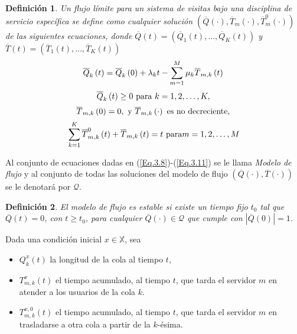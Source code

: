 \documentclass{article}
\newtheorem{Def}{Definición}
\begin{document}
\begin{Def}
Un flujo l\'imite para un sistema de visitas bajo una disciplina de servicio espec\'ifica se define como cualquier soluci\'on
 $\left(\overline{Q}\left(\cdot\right),\overline{T}_{m}\left(\cdot\right),\overline{T}_{m}^{0}\left(\cdot\right)\right)$  de las siguientes ecuaciones, donde $\overline{Q}\left(t\right)=\left(\overline{Q}_{1}\left(t\right),\ldots,\overline{Q}_{K}\left(t\right)\right)$ y $\overline{T}\left(t\right)=\left(\overline{T}_{1}\left(t\right),\ldots,\overline{T}_{K}\left(t\right)\right)$
\begin{equation}\label{Eq.3.8}
\overline{Q}_{k}\left(t\right)=\overline{Q}_{k}\left(0\right)+\lambda_{k}t-\sum_{m=1}^{M}\mu_{k}\overline{T}_{m,k}\left(t\right)\\
\end{equation}
\begin{equation}\label{Eq.3.9}
\overline{Q}_{k}\left(t\right)\geq0\textrm{ para }k=1,2,\ldots,K,\\
\end{equation}
\begin{equation}\label{Eq.3.10}
\overline{T}_{m,k}\left(0\right)=0,\textrm{ y }\overline{T}_{m,k}\left(\cdot\right)\textrm{ es no decreciente},\\
\end{equation}
\begin{equation}\label{Eq.3.11}
\sum_{k=1}^{K}\overline{T}_{m,k}^{0}\left(t\right)+\overline{T}_{m,k}\left(t\right)=t\textrm{ para}m=1,2,\ldots,M\\
\end{equation}
\end{Def}

Al conjunto de ecuaciones dadas en (\ref{Eq.3.8})-(\ref{Eq.3.11}) se le llama {\em Modelo de flujo} y al conjunto de todas las
soluciones del modelo de flujo $\left(\overline{Q}\left(\cdot\right),\overline{T} \left(\cdot\right)\right)$ se le denotar\'a por $\mathcal{Q}$.


\begin{Def}
El modelo de flujo es estable si existe un tiempo fijo $t_{0}$ tal que $\overline{Q}\left(t\right)=0$, con $t\geq t_{0}$, para cualquier $\overline{Q}\left(\cdot\right)\in\mathcal{Q}$ que cumple con $|\overline{Q}\left(0\right)|=1$.
\end{Def}

Dada una condici\'on inicial $x\in\mathbb{X}$, sea

\begin{itemize}
\item $Q_{k}^{x}\left(t\right)$ la longitud de la cola al tiempo
$t$,

\item $T_{m,k}^{x}\left(t\right)$ el tiempo acumulado, al tiempo $t$, que tarda el servidor $m$ en atender a los usuarios de la cola $k$.

\item $T_{m,k}^{x,0}\left(t\right)$ el tiempo acumulado, al tiempo $t$, que tarda el servidor $m$ en trasladarse a otra cola a partir de la $k$-\'esima.\\
\end{itemize}
\end{document}

